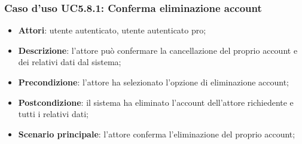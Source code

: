 \subsubsection{Caso d'uso UC5.8.1: Conferma eliminazione account}

\begin{itemize}
	\item \textbf{Attori}: utente autenticato, utente autenticato pro;
	\item \textbf{Descrizione}: l'attore può confermare la cancellazione del proprio account e dei relativi dati dal sistema;
	\item \textbf{Precondizione}: l'attore ha selezionato l'opzione di eliminazione account;
	\item \textbf{Postcondizione}: il sistema ha eliminato l'account dell'attore richiedente e tutti i relativi dati;
	\item \textbf{Scenario principale}: l'attore conferma l'eliminazione del proprio account;
\end{itemize}